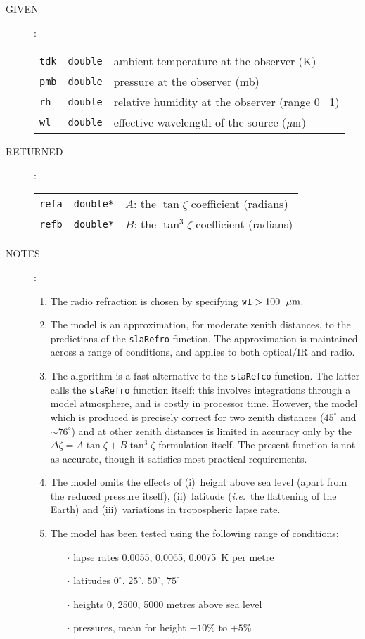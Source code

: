 \documentclass[11pt,fleqn,twoside]{article}
\renewcommand{\_}{{\tt\char'137}}     %
\newlength{\oldspacing}
\newcommand{\args}[2]
{
  \goodbreak
  \setlength{\oldspacing}{\topsep}
  \setlength{\topsep}{0.3ex}
  \begin{description}
  \item[#1]:\\[1.5ex]
    \begin{tabular}{p{6.7em}p{6.8em}p{22em}}
      #2
    \end{tabular}
  \end{description}
  \setlength{\topsep}{\oldspacing}
}
\newcommand{\spec}[3]
{
  {\tt \mbox{#1}} & {\tt \mbox{#2}} & {#3}
}
\newcommand{\notes}[1]
{
  \goodbreak
  \setlength{\oldspacing}{\topsep}
  \setlength{\topsep}{0.3ex}
  \begin{description}
    \item[NOTES]:
        #1
  \end{description}
  \setlength{\topsep}{\oldspacing}
}
\begin{document}
\args{GIVEN}
{
 \spec{tdk}{double}{ambient temperature at the observer (K)} \\
 \spec{pmb}{double}{pressure at the observer (mb)} \\
 \spec{rh}{double}{relative humidity at the observer (range 0\,--\,1)} \\
 \spec{wl}{double}{effective wavelength of the source ($\mu{\rm m}$)}
}
\args{RETURNED}
{
 \spec{refa}{double*}{$A$: the $\tan \zeta$ coefficient (radians)} \\
 \spec{refb}{double*}{$B$: the $\tan^{3} \zeta$ coefficient (radians)}
}
\notes
{
 \begin{enumerate}
  \item The radio refraction is chosen by specifying
        ${\tt wl}>100$~$\mu{\rm m}$.
  \item The model is an approximation, for moderate zenith distances,
        to the predictions of the {\tt slaRefro} function.  The approximation
        is maintained across a range of conditions, and applies to
        both optical/IR and radio.
  \item The algorithm is a fast alternative to the {\tt slaRefco} function.
        The latter calls the {\tt slaRefro} function itself:  this involves
        integrations through a model atmosphere, and is costly in
        processor time.  However, the model which is produced is precisely
        correct for two zenith distances ($45^\circ$ and $\sim\!76^\circ$)
        and at other zenith distances is limited in accuracy only by the
        $\Delta \zeta = A \tan \zeta + B \tan^{3} \zeta$ formulation
        itself.  The present function is not as accurate, though it
        satisfies most practical requirements.
  \item The model omits the effects of (i)~height above sea level (apart
        from the reduced pressure itself), (ii)~latitude ({\it i.e.}~the
        flattening of the Earth) and (iii)~variations in tropospheric
        lapse rate.
  \item The model has been tested using the following range of conditions:
        \begin{itemize}
        \item [$\cdot$] lapse rates 0.0055, 0.0065, 0.0075~K per metre
        \item [$\cdot$] latitudes $0^\circ$,
                        $25^\circ$, $50^\circ$, $75^\circ$
        \item [$\cdot$] heights 0, 2500, 5000 metres above sea level
        \item [$\cdot$] pressures, mean for height $-10$\% to $+5$\%

\end{itemize}
\end{enumerate}}
\end{document}
